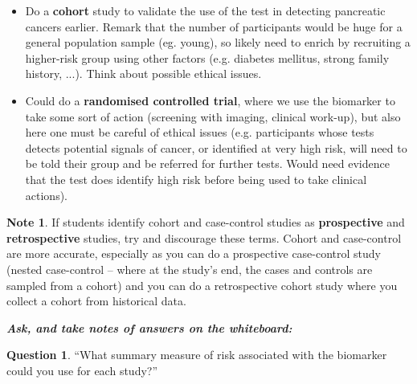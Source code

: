 \documentclass[a4paper,11pt]{scrartcl}
\theoremstyle{plain}
\theoremstyle{remark}
\theoremstyle{definition}
\newtheorem{note}[thm]{Note}
\newtheorem{quest}[thm]{Question}
\begin{document}
\begin{itshape}
\begin{itemize}
\begin{itemize}
	\end{itemize}
\item Do a \textbf{cohort} study to validate the use of the test in detecting pancreatic cancers earlier. Remark that the number of participants would be huge for a general population sample (eg. young), so likely need to enrich by recruiting a higher-risk group using other factors (e.g. diabetes mellitus, strong family history, ...). Think about possible ethical issues.
\item Could do a \textbf{randomised controlled trial}, where we use the biomarker to take some sort of action (screening with imaging, clinical work-up), but also here one must be careful of ethical issues (e.g. participants whose tests detects potential signals of cancer, or identified at very high risk, will need to be told their group and be referred for further tests. Would need evidence that the test does identify high risk before being used to take clinical actions).
\end{itemize}
\end{itshape}

\begin{note}
If students identify cohort and case-control studies as \textbf{prospective} and \textbf{retrospective} studies, try and discourage these terms. Cohort and case-control are more accurate, especially as you can do a prospective case-control study (nested case-control – where at the study's end, the cases and controls are sampled from a cohort) and you can do a retrospective cohort study where you collect a cohort from historical data.
\end{note}

\textit{\textbf{Ask, and take notes of answers on the whiteboard:}}

\begin{quest} ``What summary measure of risk associated with the biomarker could you use for each study?''
\end{quest}
\end{document}
